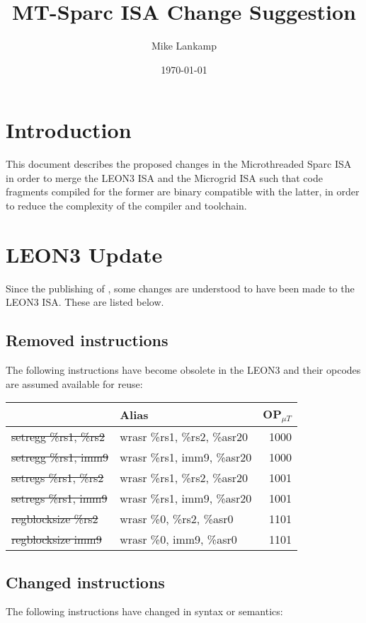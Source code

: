 \documentclass[a4paper,11pt]{article}
\title{MT-Sparc ISA Change Suggestion}
\author{Mike Lankamp}
\date{\today}
\newcommand{\leon}{{LEON3}\xspace}
\begin{document}
\maketitle

\section{Introduction}
This document describes the proposed changes in the Microthreaded Sparc ISA in order to merge the \leon ISA \cite{AppleCoreD6.3} and the Microgrid ISA such that code fragments compiled for the former are binary compatible with the latter, in order to reduce the complexity of the compiler and toolchain.

\section{\leon Update}
Since the publishing of \cite{AppleCoreD6.3}, some changes are understood to have been made to the \leon ISA. These are listed below.

\subsection{Removed instructions}
The following instructions have become obsolete in the \leon and their opcodes are assumed available for reuse:

\begin{tabular}{|>{\ttfamily}l||>{\ttfamily}l|r|}
\hline
{\normalfont \leon} & {\normalfont Alias} & OP$_{{\mu}T}$\\
\hline
\hline
\sout{setregg \%rs1, \%rs2} & wrasr \%rs1, \%rs2, \%asr20 & 1000\\
\sout{setregg \%rs1,  imm9} & wrasr \%rs1,  imm9, \%asr20 & 1000\\
\sout{setregs \%rs1, \%rs2} & wrasr \%rs1, \%rs2, \%asr20 & 1001\\
\sout{setregs \%rs1,  imm9} & wrasr \%rs1,  imm9, \%asr20 & 1001\\
\sout{regblocksize \%rs2} & wrasr \%0, \%rs2, \%asr0 & 1101 \\
\sout{regblocksize  imm9} & wrasr \%0,  imm9, \%asr0 & 1101 \\
\hline
\end{tabular}

\subsection{Changed instructions}
The following instructions have changed in syntax or semantics:
\end{document}
